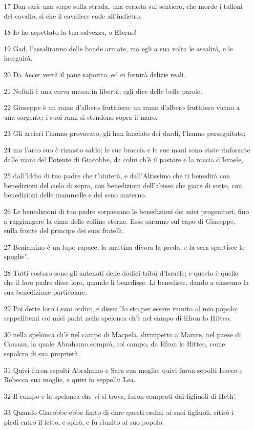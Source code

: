 \par 17 Dan sarà una serpe sulla strada, una cerasta sul sentiero, che morde i talloni del cavallo, sì che il cavaliere cade all'indietro.
\par 18 Io ho aspettato la tua salvezza, o Eterno!
\par 19 Gad, l'assaliranno delle bande armate, ma egli a sua volta le assalirà, e le inseguirà.
\par 20 Da Ascer verrà il pane saporito, ed ei fornirà delizie reali.
\par 21 Neftali è una cerva messa in libertà; egli dice delle belle parole.
\par 22 Giuseppe è un ramo d'albero fruttifero; un ramo d'albero fruttifero vicino a una sorgente; i suoi rami si stendono sopra il muro.
\par 23 Gli arcieri l'hanno provocato, gli han lanciato dei dardi, l'hanno perseguitato;
\par 24 ma l'arco suo è rimasto saldo; le sue braccia e le sue mani sono state rinforzate dalle mani del Potente di Giacobbe, da colui ch'è il pastore e la roccia d'Israele,
\par 25 dall'Iddio di tuo padre che t'aiuterà, e dall'Altissimo che ti benedirà con benedizioni del cielo di sopra, con benedizioni dell'abisso che giace di sotto, con benedizioni delle mammelle e del seno materno.
\par 26 Le benedizioni di tuo padre sorpassano le benedizioni dei miei progenitori, fino a raggiungere la cima delle colline eterne. Esse saranno sul capo di Giuseppe, sulla fronte del principe dei suoi fratelli.
\par 27 Beniamino è un lupo rapace; la mattina divora la preda, e la sera spartisce le spoglie".
\par 28 Tutti costoro sono gli antenati delle dodici tribù d'Israele; e questo è quello che il loro padre disse loro, quando li benedisse. Li benedisse, dando a ciascuno la sua benedizione particolare.
\par 29 Poi dette loro i suoi ordini, e disse: 'Io sto per essere riunito al mio popolo; seppellitemi coi miei padri nella spelonca ch'è nel campo di Efron lo Hitteo,
\par 30 nella spelonca ch'è nel campo di Macpela, dirimpetto a Mamre, nel paese di Canaan, la quale Abrahamo comprò, col campo, da Efron lo Hitteo, come sepolcro di sua proprietà.
\par 31 Quivi furon sepolti Abrahamo e Sara sua moglie; quivi furon sepolti Isacco e Rebecca sua moglie, e quivi io seppellii Lea.
\par 32 Il campo e la spelonca che vi si trova, furon comprati dai figliuoli di Heth'.
\par 33 Quando Giacobbe ebbe finito di dare questi ordini ai suoi figliuoli, ritirò i piedi entro il letto, e spirò, e fu riunito al suo popolo.

